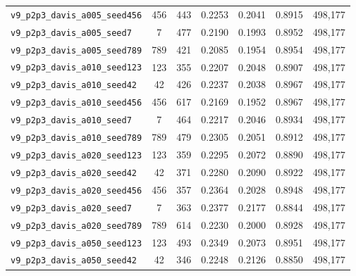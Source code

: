 \begin{table}[!h]
\begin{tabular}{p{4.8cm}cccccc}
\texttt{v9\_\allowbreak{}p2p3\_\allowbreak{}davis\_\allowbreak{}a005\_\allowbreak{}seed456} & 456 & 443 & 0.2253 & 0.2041 & 0.8915 & 498,177 \\
\texttt{v9\_\allowbreak{}p2p3\_\allowbreak{}davis\_\allowbreak{}a005\_\allowbreak{}seed7} & 7 & 477 & 0.2190 & 0.1993 & 0.8952 & 498,177 \\
\texttt{v9\_\allowbreak{}p2p3\_\allowbreak{}davis\_\allowbreak{}a005\_\allowbreak{}seed789} & 789 & 421 & 0.2085 & 0.1954 & 0.8954 & 498,177 \\
\texttt{v9\_\allowbreak{}p2p3\_\allowbreak{}davis\_\allowbreak{}a010\_\allowbreak{}seed123} & 123 & 355 & 0.2207 & 0.2048 & 0.8907 & 498,177 \\
\texttt{v9\_\allowbreak{}p2p3\_\allowbreak{}davis\_\allowbreak{}a010\_\allowbreak{}seed42} & 42 & 426 & 0.2237 & 0.2038 & 0.8967 & 498,177 \\
\texttt{v9\_\allowbreak{}p2p3\_\allowbreak{}davis\_\allowbreak{}a010\_\allowbreak{}seed456} & 456 & 617 & 0.2169 & 0.1952 & 0.8967 & 498,177 \\
\texttt{v9\_\allowbreak{}p2p3\_\allowbreak{}davis\_\allowbreak{}a010\_\allowbreak{}seed7} & 7 & 464 & 0.2217 & 0.2046 & 0.8934 & 498,177 \\
\texttt{v9\_\allowbreak{}p2p3\_\allowbreak{}davis\_\allowbreak{}a010\_\allowbreak{}seed789} & 789 & 479 & 0.2305 & 0.2051 & 0.8912 & 498,177 \\
\texttt{v9\_\allowbreak{}p2p3\_\allowbreak{}davis\_\allowbreak{}a020\_\allowbreak{}seed123} & 123 & 359 & 0.2295 & 0.2072 & 0.8890 & 498,177 \\
\texttt{v9\_\allowbreak{}p2p3\_\allowbreak{}davis\_\allowbreak{}a020\_\allowbreak{}seed42} & 42 & 371 & 0.2280 & 0.2090 & 0.8922 & 498,177 \\
\texttt{v9\_\allowbreak{}p2p3\_\allowbreak{}davis\_\allowbreak{}a020\_\allowbreak{}seed456} & 456 & 357 & 0.2364 & 0.2028 & 0.8948 & 498,177 \\
\texttt{v9\_\allowbreak{}p2p3\_\allowbreak{}davis\_\allowbreak{}a020\_\allowbreak{}seed7} & 7 & 363 & 0.2377 & 0.2177 & 0.8844 & 498,177 \\
\texttt{v9\_\allowbreak{}p2p3\_\allowbreak{}davis\_\allowbreak{}a020\_\allowbreak{}seed789} & 789 & 614 & 0.2230 & 0.2000 & 0.8928 & 498,177 \\
\texttt{v9\_\allowbreak{}p2p3\_\allowbreak{}davis\_\allowbreak{}a050\_\allowbreak{}seed123} & 123 & 493 & 0.2349 & 0.2073 & 0.8951 & 498,177 \\
\texttt{v9\_\allowbreak{}p2p3\_\allowbreak{}davis\_\allowbreak{}a050\_\allowbreak{}seed42} & 42 & 346 & 0.2248 & 0.2126 & 0.8850 & 498,177 \\

\end{tabular}
\end{table}
